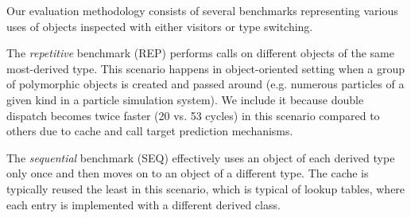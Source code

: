 
Our evaluation methodology consists of several benchmarks representing various 
uses of objects inspected with either visitors or type switching.

The \emph{repetitive} benchmark (REP) performs calls on different objects of the 
same most-derived type. This scenario happens in object-oriented setting when a 
group of polymorphic objects is created and passed around (e.g. numerous 
particles of a given kind in a particle simulation system). We include it 
because double dispatch becomes twice faster (20 vs. 53 cycles) in this 
scenario compared to others due to cache and call target prediction mechanisms. 

The \emph{sequential} benchmark (SEQ) effectively uses an object of each derived type only 
once and then moves on to an object of a different type. The cache is typically 
reused the least in this scenario, which is typical of lookup tables, where each 
entry is implemented with a different derived class.

